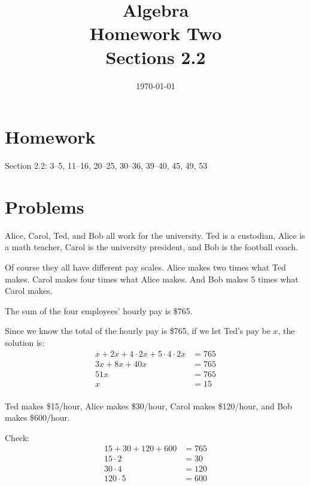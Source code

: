 \documentclass[letterpaper, landscape]{exam}
\title{Algebra \\ Homework Two \\ Sections 2.2}
\author{}
\date{\today}
\begin{document}
  \maketitle

  \section{Homework}
  Section 2.2: 3--5, 11--16, 20--25, 30--36, 39--40, 45, 49, 53

  \section{Problems}

  \begin{questions}

    \question{}
    Alice, Carol, Ted, and Bob all work for the university.  Ted is a
    custodian, Alice is a math teacher, Carol is the university president, and
    Bob is the football coach.   

    Of course they all have different pay scales.  Alice makes two times what
    Ted makes.  Carol makes four times what Alice makes.  And Bob makes 5
    times what Carol makes.

    The sum of the four employees' hourly pay is \$765.

    \begin{solution}
      Since we know the total of the hourly pay is \$765, if we let Ted's pay
      be $x$, the solution is:  
      \begin{align*}
        x + 2x + 4 \cdot 2x + 5 \cdot 4 \cdot 2x & = 765 \\
        3x + 8x + 40x                            & = 765 \\
        51x                                      & = 765 \\
        x                                        & = 15 \\
      \end{align*}

    Ted makes \$15/hour, Alice makes \$30/hour, Carol makes \$120/hour, and
    Bob makes \$600/hour.

    Check:
      \begin{align*}
        15 + 30 + 120 + 600 & = 765 \\
        15 \cdot 2          & = 30  \\
        30 \cdot 4          & = 120 \\
        120 \cdot 5         & = 600 \\
      \end{align*}


\end{solution}
\end{questions}
\end{document}
